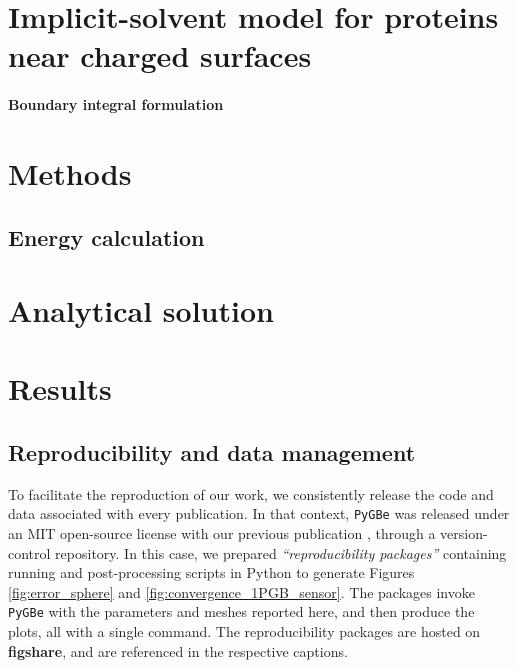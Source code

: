 \documentclass[final,5p,times,twocolumn]{elsarticle}
\newcommand{\pygbe}{\texttt{PyGBe}\xspace}
\begin{document}
\section{Implicit-solvent model for proteins near charged surfaces} \label{sec:implicit_solvent}
    

\paragraph*{Boundary integral formulation} \label{sec:bie}



\section{Methods}\label{sec:methods}

\subsection{Energy calculation} \label{sec:energy}




\section{Analytical solution} \label{sec:analytical_solution}


\section{Results} \label{sec:results}


\subsection{Reproducibility and data management}
To facilitate the reproduction of our work, we consistently release the code and data associated with every publication. In that context, \pygbe was released under an MIT open-source license with our previous publication \cite{CooperBardhanBarba2013}, through a version-control repository. 
In this case, we prepared \emph{``reproducibility packages''} containing running and post-processing scripts in Python to generate Figures \ref{fig:error_sphere} and \ref{fig:convergence_1PGB_sensor}. The packages invoke \pygbe with the parameters and meshes reported here, and then produce the plots, all with a single command.
The reproducibility packages are hosted on \textbf{figshare}, and are referenced in the respective captions.
\end{document}
